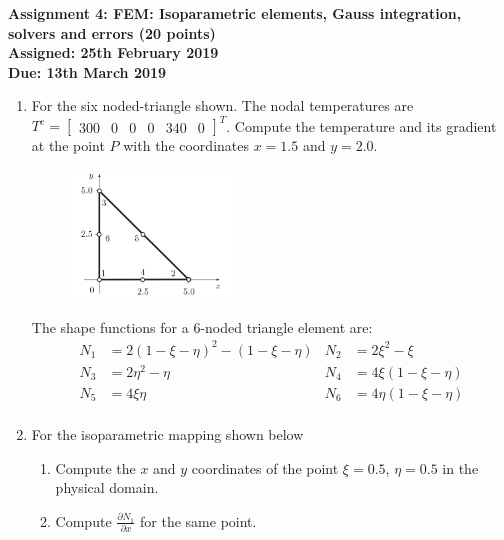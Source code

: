 \documentclass[a4paper,12pt]{article}
\begin{document}
\begin{centering}
	\textbf{
		Assignment 4: FEM: Isoparametric elements, Gauss integration, solvers and errors (20 points)\\
		Assigned: 25th February 2019\\
		Due: 13th March 2019\\
	}
\end{centering}

\vspace{1em}
 
\begin{enumerate}

	\item For the six noded-triangle shown. The nodal temperatures are $T^e = \begin{bmatrix}300 & 0 & 0 & 0 & 340 & 0 \end{bmatrix}^T$. Compute the temperature and its gradient at the point $P$ with the coordinates $x = 1.5$ and $y = 2.0$.

		
		\begin{figure}[!h]
			\centering
			\includegraphics[width=0.4\textwidth]{figs/6noded-triangle.png}
		\end{figure}

	The shape functions for a 6-noded triangle element are:
	\begin{align*}
	N_1 & = 2(1-\xi -\eta)^2 - (1 -\xi -\eta) & N_2 & = 2\xi^2 -\xi\\
	N_3 & = 2\eta^2 -\eta & N_4 & = 4\xi(1 - \xi - \eta)\\
	N_5 & = 4\xi\eta & N_6 & = 4 \eta(1 - \xi - \eta)\\
	\end{align*}
	
	\item For the isoparametric mapping shown below
		\begin{enumerate}
			\item Compute the $x$ and $y$ coordinates of the point $\xi = 0.5$, $\eta = 0.5$ in the physical domain.
			\item Compute $\frac{\partial N_1}{\partial x}$ for the same point.
		\end{enumerate}
		

\end{enumerate}
\end{document}
